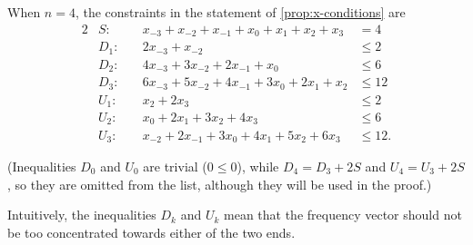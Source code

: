 \documentclass[letterpaper,reqno,11pt]{amsart}
\begin{document}
\begin{example}
    When $n = 4$, the constraints in the statement of \cref{prop:x-conditions} are 
    \begin{alignat*}{2}
        &S: & x_{-3} + x_{-2} + x_{-1} + x_0 + x_1 + x_2 + x_3 &= 4 \\
        &D_1: & 2x_{-3} + x_{-2} &\leq 2 \\
        &D_2: & 4x_{-3} + 3x_{-2} + 2x_{-1} + x_0 &\leq 6 \\
        &D_3: \quad & 6x_{-3} + 5x_{-2} + 4x_{-1} + 3x_0 + 2x_1 + x_2 &\leq 12 \\
        &U_1: & x_2 + 2x_3 &\leq 2 \\
        &U_2: & x_0 + 2x_1 + 3x_2 + 4x_3 &\leq 6 \\
        &U_3: & x_{-2} + 2x_{-1} + 3x_0 + 4x_1 + 5x_2 + 6x_3 &\leq 12.
    \end{alignat*}

    (Inequalities $D_0$ and $U_0$ are trivial ($0\leq 0$), while $D_4 = D_3 + 2S$ and $U_4 = U_3 + 2S$, so they are omitted from the list, although they will be used in the proof.)

    Intuitively, the inequalities $D_k$ and $U_k$ mean that the frequency vector should not be too concentrated towards either of the two ends. 
\end{example}
\end{document}
